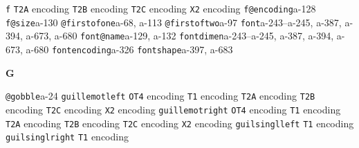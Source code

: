 \documentclass[twoside]{ltxdoc}
\makeatletter
\renewenvironment{theindex}{%
   \@restonecoltrue
   \if@twocolumn\@restonecolfalse\fi
   \columnseprule \z@
   \columnsep 35\p@
   \twocolumn[\index@prologue]%
   \IndexParms
   \let\item\@idxitem
   \ignorespaces
}{\if@restonecol\onecolumn\else\clearpage\fi}
\makeatother
\begin{document}
\begin{theindex}
  \item \texttt  {f}\efill 
    \subitem \texttt  {T2A} encoding\pfill {}
    \subitem \texttt  {T2B} encoding\pfill {}
    \subitem \texttt  {T2C} encoding\pfill {}
    \subitem \texttt  {X2} encoding\pfill {}
  \item \texttt  {f@encoding}\pfill a-128
  \item \texttt  {f@size}\pfill a-130
  \item \texttt  {@firstofone}\pfill a-68, a-113
  \item \texttt  {@firstoftwo}\pfill a-97
  \item \texttt  {font}\pfill a-243--a-245, a-387, a-394, 
                a-673, a-680
  \item \texttt  {font@name}\pfill a-129, a-132
  \item \texttt  {fontdimen}\pfill a-243--a-245, a-387, 
                a-394, a-673, a-680
  \item \texttt  {fontencoding}\pfill a-326
  \item \texttt  {fontshape}\pfill a-397, a-683

  \indexspace
{\bfseries\hfil G\hfil}\nopagebreak

  \item \texttt  {@gobble}\pfill a-24
  \item \texttt  {guillemotleft}\efill 
    \subitem \texttt  {OT4} encoding\pfill {}
    \subitem \texttt  {T1} encoding\pfill {}
    \subitem \texttt  {T2A} encoding\pfill {}
    \subitem \texttt  {T2B} encoding\pfill {}
    \subitem \texttt  {T2C} encoding\pfill {}
    \subitem \texttt  {X2} encoding\pfill {}
  \item \texttt  {guillemotright}\efill 
    \subitem \texttt  {OT4} encoding\pfill {}
    \subitem \texttt  {T1} encoding\pfill {}
    \subitem \texttt  {T2A} encoding\pfill {}
    \subitem \texttt  {T2B} encoding\pfill {}
    \subitem \texttt  {T2C} encoding\pfill {}
    \subitem \texttt  {X2} encoding\pfill {}
  \item \texttt  {guilsinglleft}\efill 
    \subitem \texttt  {T1} encoding\pfill {}
  \item \texttt  {guilsinglright}\efill 
    \subitem \texttt  {T1} encoding\pfill {}


\end{theindex}
\end{document}
